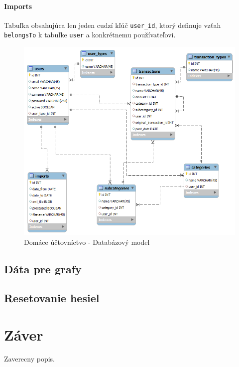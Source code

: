\documentclass[12pt,oneside]{book}
\begin{document}
\subsubsection{Imports}
Tabuľka obsahujúca len jeden cudzí kľúč \texttt{user\_id}, ktorý definuje vzťah \texttt{belongsTo} k tabuľke \texttt{user} a konkrétnemu používateľovi.
\begin{figure}[ht]
  \centering
      \includegraphics[width=15cm]{databazovy_model}
  \caption{Domáce účtovníctvo - Databázový model}
  \label{DataModel}
\end{figure}    

\section{Dáta pre grafy}

\section{Resetovanie hesiel}


\chapter{Záver}\label{chap:outro}
 
Zaverecny popis.

\backmatter

\nocite{*}


\end{document}
